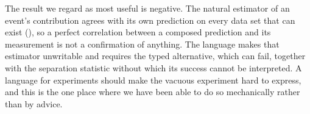 \documentclass[11pt,twocolumn,a4paper]{article}
\theoremstyle{thmstyle}
\theoremstyle{definition}
\theoremstyle{remark}
\begin{document}
The result we regard as most useful is negative. The natural estimator of an
event's contribution agrees with its own prediction on every data set that can
exist (), so a perfect correlation between a composed
prediction and its measurement is not a confirmation of anything. The language
makes that estimator unwritable and requires the typed alternative, which can
fail, together with the separation statistic without which its success cannot
be interpreted. A language for experiments should make the vacuous experiment
hard to express, and this is the one place where we have been able to do so
mechanically rather than by advice.



\end{document}
